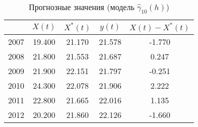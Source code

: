 \begin{table}[ht]
\centering
\caption{Прогнозные значения (модель $ \widehat{\gamma}_{10}(h) $)} 
\label{table:auto-class-18-prediction}
\begin{tabular}{r|cccc}
  \hline
 & $X(t)$ & $X^{*}(t)$ & $y(t)$ & $ X(t) - X^{*}(t) $ \\ 
  \hline
2007 & 19.400 & 21.170 & 21.578 & -1.770 \\ 
  2008 & 21.800 & 21.553 & 21.687 & 0.247 \\ 
  2009 & 21.900 & 22.151 & 21.797 & -0.251 \\ 
  2010 & 24.300 & 22.078 & 21.906 & 2.222 \\ 
  2011 & 22.800 & 21.665 & 22.016 & 1.135 \\ 
  2012 & 20.200 & 21.860 & 22.126 & -1.660 \\ 
   \hline
\end{tabular}
\end{table}
